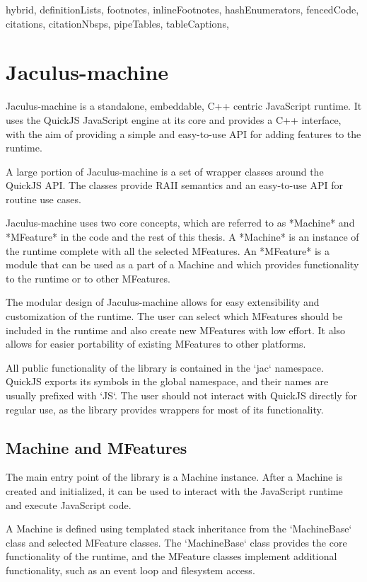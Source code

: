 \begin{markdown*}{%
  hybrid,
  definitionLists,
  footnotes,
  inlineFootnotes,
  hashEnumerators,
  fencedCode,
  citations,
  citationNbsps,
  pipeTables,
  tableCaptions,
}

\chapter{Jaculus-machine} \label{chap:machine}

Jaculus-machine is a standalone, embeddable, C++ centric JavaScript runtime. It uses the QuickJS JavaScript engine at its core and provides a C++ interface, with the aim of providing a simple and easy-to-use API for adding features to the runtime.

A large portion of Jaculus-machine is a set of wrapper classes around the QuickJS API. The classes provide RAII semantics and an easy-to-use API for routine use cases.

Jaculus-machine uses two core concepts, which are referred to as *Machine* and *MFeature* in the code and the rest of this thesis. A *Machine* is an instance of the runtime complete with all the selected MFeatures. An *MFeature* is a module that can be used as a part of a Machine and which provides functionality to the runtime or to other MFeatures.

The modular design of Jaculus-machine allows for easy extensibility and customization of the runtime. The user can select which MFeatures should be included in the runtime and also create new MFeatures with low effort. It also allows for easier portability of existing MFeatures to other platforms.

All public functionality of the library is contained in the `jac` namespace. QuickJS exports its symbols in the global namespace, and their names are usually prefixed with `JS`. The user should not interact with QuickJS directly for regular use, as the library provides wrappers for most of its functionality.

\section{Machine and MFeatures}

The main entry point of the library is a Machine instance. After a Machine is created and initialized, it can be used to interact with the JavaScript runtime and execute JavaScript code.

A Machine is defined using templated stack inheritance from the `MachineBase` class and selected MFeature classes. The `MachineBase` class provides the core functionality of the runtime, and the MFeature classes implement additional functionality, such as an event loop and filesystem access.


\end{markdown*}
